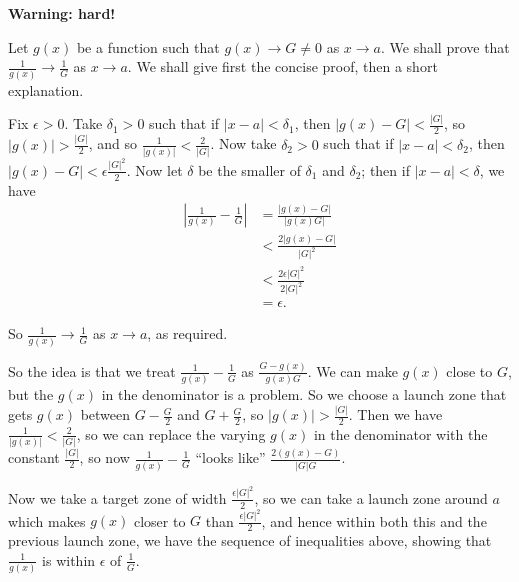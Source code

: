 \documentclass{article}
\begin{document}
\textbf{Warning: hard!}\medskip


Let $g(x)$ be a function such that $g(x)\to G\neq 0$ as $x\to a$. We shall prove that $\frac{1}{g(x)}\to \frac{1}{G}$ as $x\to a$. We shall give first the concise proof, then a short explanation.\medskip

{\color{red}
Fix $\epsilon>0$. Take $\delta_1>0$ such that if $|x-a|<\delta_1$, then $|g(x)-G|<\frac{|G|}{2}$, so $|g(x)|>\frac{|G|}{2}$, and so $\frac{1}{|g(x)|}<\frac{2}{|G|}$. Now take $\delta_2>0$ such that if $|x-a|<\delta_2$, then $|g(x)-G|<\epsilon\frac{|G|^2}{2}$. Now let $\delta$ be the smaller of $\delta_1$ and $\delta_2$; then if $|x-a|<\delta$, we have
\begin{align*}
	\left|\frac{1}{g(x)}-\frac{1}{G}\right| &=\frac{|g(x)-G|}{|g(x)G|}\\
	&< \frac{2|g(x)-G|}{|G|^2}\\
	&< \frac{2\epsilon|G|^2}{2|G|^2}\\
	&= \epsilon.
\end{align*}

So $\frac{1}{g(x)}\to \frac{1}{G}$ as $x\to a$, as required.
}

\bigskip


So the idea is that we treat $\frac{1}{g(x)}-\frac{1}{G}$ as $\frac{G-g(x)}{g(x)G}$. We can make $g(x)$ close to $G$, but the $g(x)$ in the denominator is a problem. So we choose a launch zone that gets $g(x)$ between $G-\frac{G}{2}$ and $G+\frac{G}{2}$, so $|g(x)|>\frac{|G|}{2}$. Then we have $\frac{1}{|g(x)|}<\frac{2}{|G|}$, so we can replace the varying $g(x)$ in the denominator with the constant $\frac{|G|}{2}$, so now $\frac{1}{g(x)}-\frac{1}{G}$ ``looks like'' $\frac{2(g(x)-G)}{|G|G}$.

Now we take a target zone of width $\frac{\epsilon|G|^2}{2}$, so we can take a launch zone around $a$ which makes $g(x)$ closer to $G$ than $\frac{\epsilon|G|^2}{2}$, and hence within both this and the previous launch zone, we have the sequence of inequalities above, showing that $\frac{1}{g(x)}$ is within $\epsilon$ of $\frac{1}{G}$.
\end{document}
